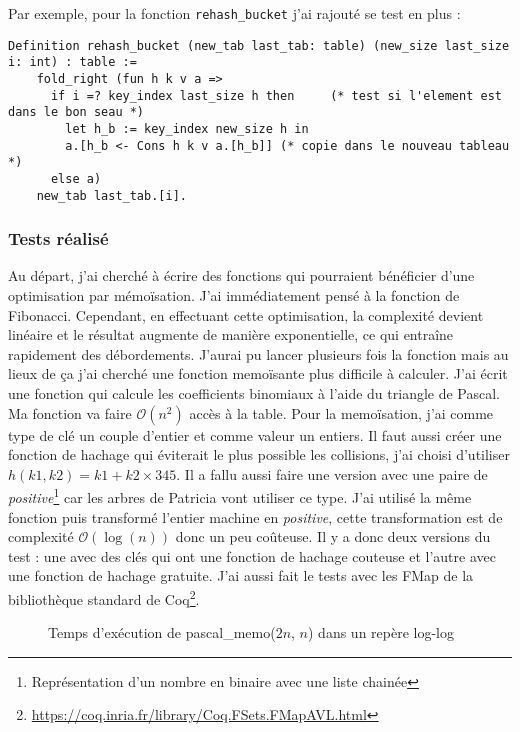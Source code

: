 \documentclass{article}
\begin{document}
Par exemple, pour la fonction \texttt{rehash\_bucket} j'ai rajouté se test en
plus :

\begin{lstlisting}[language=Coq]
  Definition rehash_bucket (new_tab last_tab: table) (new_size last_size i: int) : table :=
    fold_right (fun h k v a =>
      if i =? key_index last_size h then     (* test si l'element est dans le bon seau *)
        let h_b := key_index new_size h in
        a.[h_b <- Cons h k v a.[h_b]] (* copie dans le nouveau tableau *)
      else a)
    new_tab last_tab.[i].
\end{lstlisting}

      \subsubsection{Tests réalisé}

  Au départ, j'ai cherché à écrire des fonctions qui pourraient
bénéficier d'une optimisation par mémoïsation. J'ai immédiatement pensé à la
fonction de Fibonacci. Cependant, en effectuant cette optimisation, la
complexité devient linéaire et le résultat augmente de manière exponentielle,
ce qui entraîne rapidement des débordements. J'aurai pu lancer plusieurs fois la
fonction mais au lieux de ça j'ai cherché une fonction memoïsante plus
difficile à calculer. J'ai écrit une fonction qui calcule
les coefficients binomiaux à l'aide du triangle de Pascal. Ma fonction va faire
$\mathcal{O}(n^2)$ accès à la table. Pour la memoïsation, j'ai comme type
de clé un couple d'entier et comme valeur un entiers. Il faut aussi créer une
fonction de hachage qui éviterait le plus possible les collisions, j'ai
choisi d'utiliser $h(k1, k2)= k1 + k2 \times 345$. Il a fallu aussi faire une
version avec une paire de \textit{positive}\footnote{Représentation d'un nombre
en binaire avec une liste chainée} car les arbres de Patricia vont utiliser ce
type. J'ai utilisé la même fonction puis transformé l'entier
machine en \textit{positive}, cette transformation est de complexité
$\mathcal{O}(\log(n))$ donc un peu coûteuse. Il y a donc deux versions du
test : une avec des clés qui ont une fonction de hachage couteuse et l'autre
avec une fonction de hachage gratuite. J'ai aussi fait le tests avec les
FMap de la bibliothèque standard de Coq\footnote{
\url{https://coq.inria.fr/library/Coq.FSets.FMapAVL.html}}.

\begin{figure}[ht]
  \centering
  \scalebox{.7}{}
  \caption{Temps d'exécution de pascal\_memo($2n$, $n$) dans un repère log-log}
  \label{fig:pascal}
\end{figure}
\end{document}
